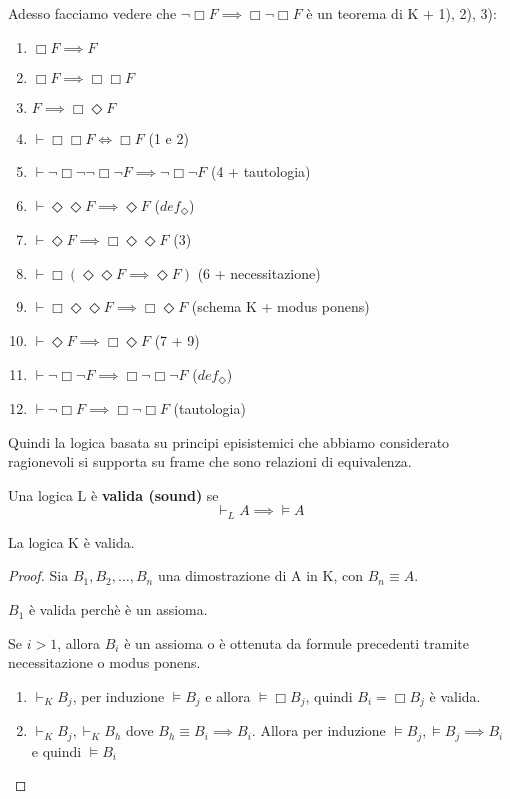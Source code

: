 \documentclass[../main.tex]{subfiles}
\begin{document}
Adesso facciamo vedere che $\neg \Box F \implies \Box \neg \Box F$ è un teorema di K + 1), 2), 3):
\begin{enumerate}
    \item $\Box F \implies F$
    \item $\Box F \implies \Box \Box F$
    \item $F \implies \Box \Diamond F$
    \item $\vdash \Box \Box F \iff \Box F$ (1 e 2)
    \item $\vdash \neg \Box \neg \neg \Box \neg F \implies \neg \Box \neg F$ (4 + tautologia)
    \item $\vdash \Diamond \Diamond F \implies \Diamond F$ ($def_\Diamond$)
    \item $\vdash \Diamond F \implies \Box \Diamond \Diamond F$ (3)
    \item $\vdash \Box(\Diamond \Diamond F \implies \Diamond F)$ (6 + necessitazione)
    \item $\vdash \Box \Diamond \Diamond F \implies \Box \Diamond F$ (schema K + modus ponens)
    \item $\vdash \Diamond F \implies \Box \Diamond F$ (7 + 9)
    \item $\vdash \neg \Box \neg F \implies \Box \neg \Box \neg F$ ($def_\Diamond$)
    \item $\vdash \neg \Box F \implies \Box \neg \Box F$ (tautologia)
\end{enumerate}
Quindi la logica basata su principi episistemici che abbiamo considerato ragionevoli si supporta su frame che sono relazioni di equivalenza.
\begin{definition}
    Una logica L è \textbf{valida (sound)} se
    \begin{equation*}
        \vdash_L A \implies \vDash A
    \end{equation*}
\end{definition}
\begin{theorem}
    La logica K è valida.
\end{theorem}
\begin{proof}
    Sia $B_1,B_2,\ldots,B_n$ una dimostrazione di A in K, con $B_n \equiv A$.

    $B_1$ è valida perchè è un assioma.

    Se $i > 1$, allora $B_i$ è un assioma o è ottenuta da formule precedenti tramite necessitazione o modus ponens.
    \begin{enumerate}
        \item $\vdash_K B_j$, per induzione $\vDash B_j$ e allora $\vDash \Box B_j$, quindi $B_i = \Box B_j$ è valida.
        \item $\vdash_K B_j, \vdash_K B_h$ dove $B_h \equiv B_i \implies B_i$. Allora per induzione $\vDash B_j, \vDash B_j \implies B_i$\\
              e quindi $\vDash B_i$
    \end{enumerate}
\end{proof}
\end{document}

